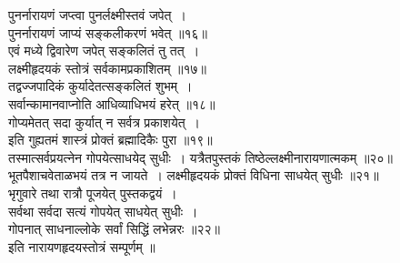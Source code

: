 \documentclass[twoside,top=1.7cm, bottom=1.7cm, outer=1cm,landscape, inner=1.5cm,a5paper,]{book}
\begin{document}
\begin{center}
पुनर्नारायणं जप्त्वा पुनर्लक्ष्मीस्तवं जपेत्~।\\
पुनर्नारायणं जाप्यं सङ्कलीकरणं भवेत् ॥१६॥\\[10pt]
एवं मध्ये द्विवारेण जपेत् सङ्कलितं तु तत्~।\\
लक्ष्मीहृदयकं स्तोत्रं सर्वकामप्रकाशितम् ॥१७॥\\[10pt]
तद्वज्जपादिकं कुर्यादेतत्सङ्कलितं शुभम्~।\\
सर्वान्कामानवाप्नोति आधिव्याधिभयं हरेत् ॥१८॥\\[10pt]
\newpage
गोप्यमेतत् सदा कुर्यात् न सर्वत्र प्रकाशयेत्~।\\
इति गुह्यतमं शास्त्रं प्रोक्तं ब्रह्मादिकैः पुरा ॥१९॥\\[10pt]
तस्मात्सर्वप्रयत्नेन गोपयेत्साधयेद्  सुधीः~।
यत्रैतपुस्तकं तिष्ठेल्लक्ष्मीनारायणात्मकम् ॥२०॥\\[10pt]
भूतपैशाचवेताळभयं तत्र न जायते~।
लक्ष्मीहृदयकं प्रोक्तं विधिना साधयेत् सुधीः ॥२१॥\\[10pt]
भृगुवारे तथा रात्रौ पूजयेत् पुस्तकद्वयं~।\\
सर्वथा सर्वदा सत्यं गोपयेत् साधयेत् सुधीः~।\\
गोपनात् साधनाल्लोके सर्वां सिद्धिं लभेन्नरः ॥२२॥\\[10pt]
इति नारायणहृदयस्तोत्रं सम्पूर्णम् ॥\\[10pt]

\end{center}
\end{document}
